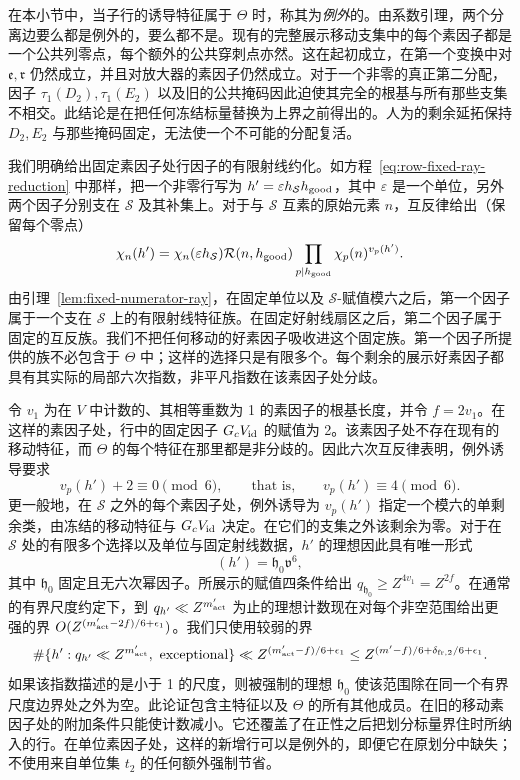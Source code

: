 \documentclass[11pt,a4paper]{article}
\numberwithin{equation}{section}
\numberwithin{figure}{section}
\theoremstyle{definition}
\theoremstyle{remark}
\begin{document}
在本小节中，当子行的诱导特征属于 \(\Theta\) 时，称其为\emph{例外}的。由系数引理，两个分离边要么都是例外的，要么都不是。现有的完整展示移动支集中的每个素因子都是一个公共列零点，每个额外的公共穿刺点亦然。这在起初成立，在第一个变换中对 \(\mathfrak e,\mathfrak r\) 仍然成立，并且对放大器的素因子仍然成立。对于一个非零的真正第二分配，因子 \(\tau_1(D_2),\tau_1(E_2)\) 以及旧的公共掩码因此迫使其完全的根基与所有那些支集不相交。此结论是在把任何冻结标量替换为上界之前得出的。人为的剩余延拓保持 \(D_2,E_2\) 与那些掩码固定，无法使一个不可能的分配复活。

我们明确给出固定素因子处行因子的有限射线约化。如方程~\eqref{eq:row-fixed-ray-reduction} 中那样，把一个非零行写为 \(h'=\varepsilon h_{\mathcal S}h_{\rm good}\)，其中 \(\varepsilon\) 是一个单位，另外两个因子分别支在 \(\mathcal S\) 及其补集上。对于与 \(\mathcal S\) 互素的原始元素 \(n\)，互反律给出（保留每个零点）
\[
 \chi_n(h')=\chi_n(\varepsilon h_{\mathcal S})
   \mathcal R(n,h_{\rm good})
   \prod_{p\mid h_{\rm good}}\chi_p(n)^{v_p(h')}.
\]
由引理~\ref{lem:fixed-numerator-ray}，在固定单位以及 \(\mathcal S\)-赋值模六之后，第一个因子属于一个支在 \(\mathcal S\) 上的有限射线特征族。在固定好射线扇区之后，第二个因子属于固定的互反族。我们不把任何移动的好素因子吸收进这个固定族。第一个因子所提供的族不必包含于 \(\Theta\) 中；这样的选择只是有限多个。每个剩余的展示好素因子都具有其实际的局部六次指数，非平凡指数在该素因子处分歧。

令 \(v_1\) 为在 \(V\) 中计数的、其相等重数为 1 的素因子的根基长度，并令 \(f=2v_1\)。在这样的素因子处，行中的固定因子 \(G_cV_{\rm id}\) 的赋值为 2。该素因子处不存在现有的移动特征，而 \(\Theta\) 的每个特征在那里都是非分歧的。因此六次互反律表明，例外诱导要求
\[
 v_p(h')+2\equiv0\pmod6,\qquad\text{that is,}\qquad
 v_p(h')\equiv4\pmod6.
\]
更一般地，在 \(\mathcal S\) 之外的每个素因子处，例外诱导为 \(v_p(h')\) 指定一个模六的单剩余类，由冻结的移动特征与 \(G_cV_{\rm id}\) 决定。在它们的支集之外该剩余为零。对于在 \(\mathcal S\) 处的有限多个选择以及单位与固定射线数据，\(h'\) 的理想因此具有唯一形式
\[
 (h')=\mathfrak h_0\mathfrak v^6,
\]
其中 \(\mathfrak h_0\) 固定且无六次幂因子。所展示的赋值四条件给出 \(q_{\mathfrak h_0}\ge Z^{4v_1}=Z^{2f}\)。在通常的有界尺度约定下，到 \(q_{h'}\ll Z^{m'_{\rm act}}\) 为止的理想计数现在对每个非空范围给出更强的界 \(O(Z^{(m'_{\rm act}-2f)/6+\epsilon_1})\)。我们只使用较弱的界
\begin{equation}
 \#\{h':q_{h'}\ll Z^{m'_{\rm act}},\ \text{exceptional}\}
 \ll Z^{(m'_{\rm act}-f)/6+\epsilon_1}
 \le Z^{(m'-f)/6+\delta_{{\rm fr},2}/6+\epsilon_1}.
 \label{eq:exceptional-row-count}
\end{equation}
如果该指数描述的是小于 1 的尺度，则被强制的理想 \(\mathfrak h_0\) 使该范围除在同一个有界尺度边界处之外为空。此论证包含主特征以及 \(\Theta\) 的所有其他成员。在旧的移动素因子处的附加条件只能使计数减小。它还覆盖了在正性之后把划分标量界住时所纳入的行。在单位素因子处，这样的新增行可以是例外的，即便它在原划分中缺失；不使用来自单位集 \(t_2\) 的任何额外强制节省。
\end{document}
